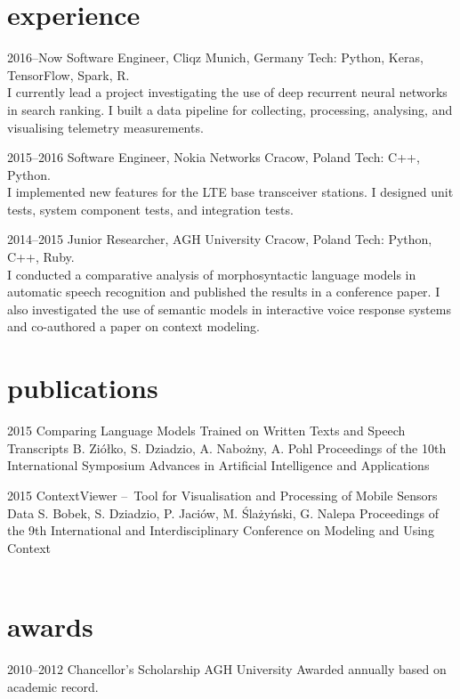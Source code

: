 \documentclass[]{friggeri-cv_osx}
\begin{document}
\section{experience}
\begin{entrylist}
\entry
{2016--Now}
{Software Engineer, Cliqz}
{Munich, Germany}
{Tech: Python, Keras, TensorFlow, Spark, R.\\I currently lead a project investigating the use of deep recurrent neural networks in search ranking. I built a data pipeline for collecting, processing, analysing, and visualising telemetry measurements.\\}

\entry
{2015--2016}
{Software Engineer, Nokia Networks}
{Cracow, Poland}
{Tech: C++, Python.\\I implemented new features for the LTE base transceiver stations. I designed unit tests, system component tests, and integration tests.\\}

\entry
{2014--2015}
{Junior Researcher, AGH University}
{Cracow, Poland}
{Tech: Python, C++, Ruby.\\I conducted a comparative analysis of morphosyntactic language models in automatic speech recognition and published the results in a conference paper. I also investigated the use of semantic models in interactive voice response systems and co-authored a paper on context modeling.\\}
\end{entrylist}

\section{publications}
\begin{entrylist}
\entry
{2015}
{Comparing Language Models Trained on Written Texts and Speech Transcripts}
{B. Ziółko, S. Dziadzio, A. Nabożny, A. Pohl}
{Proceedings of the 10th International Symposium Advances in Artificial Intelligence and Applications\\}

\entry
{2015}
{ContextViewer – Tool for Visualisation and Processing of Mobile Sensors Data}
{S. Bobek, S. Dziadzio, P. Jaciów, M. Ślażyński, G. Nalepa}
{Proceedings of the 9th International and Interdisciplinary Conference on Modeling and Using Context\\\\}
\end{entrylist}


\section{awards}
\begin{entrylist}
\entry
{2010--2012}
{Chancellor's Scholarship}
{AGH University}
{Awarded annually based on academic record.}
\end{entrylist}
\end{document}
